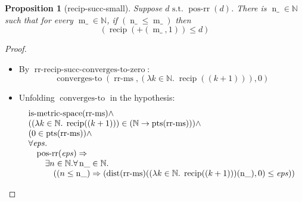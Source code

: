 \documentclass[11pt]{article}
\theoremstyle{plain}
\newtheorem{proposition}{Proposition}
\begin{document}
\bigskip

\begin{proposition}[recip-succ-small]
Suppose $d \text{ s.t. } \operatorname{pos\text{-}rr}(d)$. There is $\operatorname{n\_} \in \mathbb{N}$ such that for every $\operatorname{m\_} \in \mathbb{N}$, if $(\operatorname{n\_} \leq \operatorname{m\_})$ then 
\begin{equation*}
(\operatorname{recip}(+(\operatorname{m\_}, 1)) \leq d)
\end{equation*}

\end{proposition}

\begin{proof}
\begin{itemize}[leftmargin=2.8em, itemsep=4pt, parsep=1pt]
  \item[\textbf{3}] By $\operatorname{rr\text{-}recip\text{-}succ\text{-}converges\text{-}to\text{-}zero}$:
\begin{equation*}
\operatorname{converges\text{-}to}(\operatorname{rr\text{-}ms}, (\lambda k \in \mathbb{N}.\; \operatorname{recip}((k + 1))), 0)
\end{equation*}

  \item[\textbf{4}] Unfolding $\operatorname{converges\text{-}to}$ in the hypothesis:
\begin{equation*}
\begin{array}{@{}l@{}} \operatorname{is\text{-}metric\text{-}space}(\operatorname{rr\text{-}ms}) \wedge \\ ((\lambda k \in \mathbb{N}.\; \operatorname{recip}((k + 1))) \in (\mathbb{N} \to \operatorname{pts}(\operatorname{rr\text{-}ms}))) \wedge \\ (0 \in \operatorname{pts}(\operatorname{rr\text{-}ms})) \wedge \\ \forall \mathit{eps}. \\ \quad \operatorname{pos\text{-}rr}(\mathit{eps}) \Rightarrow  \\ \quad \quad \exists n \in \mathbb{N}. \forall \operatorname{n\_} \in \mathbb{N}. \\ \quad \quad \quad ((n \leq \operatorname{n\_}) \Rightarrow (\operatorname{dist}(\operatorname{rr\text{-}ms})((\lambda k \in \mathbb{N}.\; \operatorname{recip}((k + 1)))(\operatorname{n\_}), 0) \leq \mathit{eps})) \end{array}
\end{equation*}


\end{itemize}
\end{proof}
\end{document}
